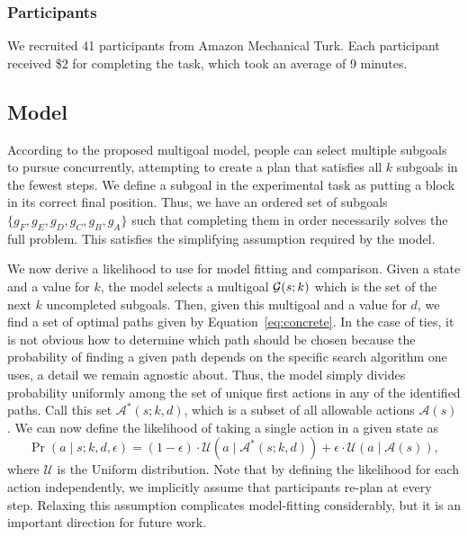 \documentclass[10pt,letterpaper]{article}
\newcommand{\red}[1]{\textcolor{red}{#1}}
\begin{document}
\subsubsection{Participants}
We recruited 41 participants from Amazon Mechanical Turk. Each participant received \$2 for completing the task, which took an average of 9 minutes.

\subsection{Model}
 
According to the proposed multigoal model, people can select multiple subgoals to pursue concurrently, attempting to create a plan that satisfies all $k$ subgoals in the fewest steps. We define a subgoal in the experimental task as putting a block in its correct final position. Thus, we have an ordered set of subgoals $\{ g_F, g_E, g_D, g_C, g_B, g_A \}$ such that completing them in order necessarily solves the full problem. This satisfies the simplifying assumption required by the model.


\newcommand{\A}{\mathcal{A}}
\newcommand{\U}{\mathcal{U}}

We now derive a likelihood to use for model fitting and comparison. Given a state and a value for $k$, the model selects a multigoal $\mathcal{G}(s; k)$ which is the set of the next $k$ uncompleted subgoals. Then, given this multigoal and a value for $d$, we find a set of optimal paths given by Equation~\ref{eq:concrete}. In the case of ties, it is not obvious how to determine which path should be chosen because the probability of finding a given path depends on the specific search algorithm one uses, a detail we remain agnostic about. Thus, the model simply divides probability uniformly among the set of unique first actions in any of the identified paths. Call this set $\A^*(s; k, d)$, which is a subset of all allowable actions $\A(s)$. We can now define the likelihood of taking a single action in a given state as
%
\begin{equation}\label{eq:likelihood-fixed}
  \Pr(a \mid s; k, d, \epsilon) = 
  (1 - \epsilon) \cdot \U(a \mid \A^*(s; k, d)) + 
  \epsilon \cdot \U(a \mid \A(s)),
\end{equation}
%
where $\U$ is the Uniform distribution. Note that by defining the likelihood for each action independently, we implicitly assume that participants re-plan at every step. Relaxing this assumption complicates model-fitting considerably, but it is an important direction for future work.
\end{document}
